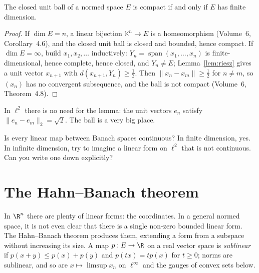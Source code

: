 \begin{theorem}[Riesz]\label{thm:rieszcompact}
The closed unit ball of a normed space $E$ is compact if and only if $E$ has finite dimension.
\end{theorem}
\begin{proof}
If $\dim E=n$, a linear bijection $\mathbb K^n\to E$ is a homeomorphism (Volume~6, Corollary~4.6), and the closed unit ball is closed and bounded, hence compact. If $\dim E=\infty$, build $x_1,x_2,\dots$ inductively:
$Y_n=\operatorname{span}(x_1,\dots,x_n)$ is finite-dimensional, hence complete, hence closed, and $Y_n\ne E$; Lemma~\ref{lem:riesz} gives a unit vector $x_{n+1}$ with $d(x_{n+1},Y_n)\ge\frac12$. Then $\|x_n-x_m\|\ge\frac12$
for $n\ne m$, so $(x_n)$ has no convergent subsequence, and the ball is not compact (Volume~6, Theorem~4.8).
\end{proof}

In $\ell^2$ there is no need for the lemma: the unit vectors $e_n$ satisfy $\|e_n-e_m\|_2=\sqrt2$. The ball is a very big place.

\begin{think}
Is every linear map between Banach spaces continuous? In finite dimension, yes. In infinite dimension, try to imagine a linear form on $\ell^2$ that is not continuous. Can you write one down explicitly?
\end{think}

\section{The Hahn--Banach theorem}

In $\R^n$ there are plenty of linear forms: the coordinates. In a general normed space, it is not even clear that there is a single non-zero bounded linear form. The Hahn--Banach theorem produces them,
extending a form from a subspace without increasing its size. A map $p:E\to\R$ on a real vector space is \emph{sublinear} if $p(x+y)\le p(x)+p(y)$ and $p(tx)=tp(x)$ for $t\ge0$; norms are sublinear, and so
are $x\mapsto\limsup x_n$ on $\ell^\infty$ and the gauges of convex sets below.

